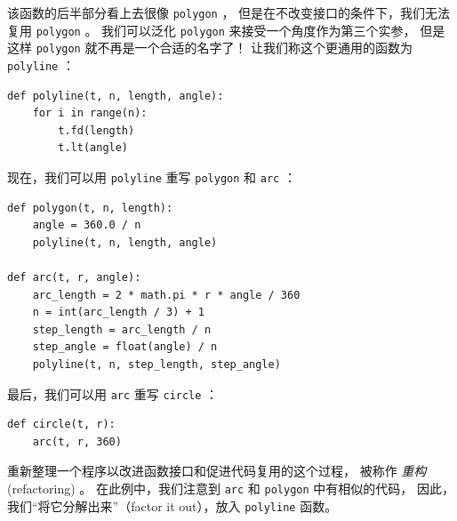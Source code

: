 
该函数的后半部分看上去很像 \lstinline{polygon} ，
但是在不改变接口的条件下，我们无法复用 \lstinline{polygon} 。
我们可以泛化 \lstinline{polygon} 来接受一个角度作为第三个实参， 但是这样 \lstinline{polygon} 就不再是一个合适的名字了！ 让我们称这个更通用的函数为 \lstinline{polyline} ：

\begin{lstlisting}
def polyline(t, n, length, angle):
    for i in range(n):
        t.fd(length)
        t.lt(angle)
\end{lstlisting}


现在，我们可以用 \lstinline{polyline} 重写 \lstinline{polygon} 和 \lstinline{arc} ：

\begin{lstlisting}
def polygon(t, n, length):
    angle = 360.0 / n
    polyline(t, n, length, angle)

def arc(t, r, angle):
    arc_length = 2 * math.pi * r * angle / 360
    n = int(arc_length / 3) + 1
    step_length = arc_length / n
    step_angle = float(angle) / n
    polyline(t, n, step_length, step_angle)
\end{lstlisting}


最后，我们可以用 \lstinline{arc} 重写 \lstinline{circle} ：

\begin{lstlisting}
def circle(t, r):
    arc(t, r, 360)
\end{lstlisting}


重新整理一个程序以改进函数接口和促进代码复用的这个过程，
被称作 \emph{重构} (refactoring) 。
在此例中，我们注意到 \lstinline{arc} 和 \lstinline{polygon} 中有相似的代码，
因此，我们“将它分解出来”（factor it out），放入 \lstinline{polyline} 函数。

